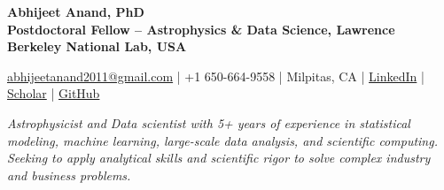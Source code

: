 \documentclass[a4paper,10pt]{article}
\begin{document}
\begin{center}
    {\huge \textbf{Abhijeet Anand, PhD}} \\
    {\normalsize \vspace{1.5mm}
    \textbf{Postdoctoral Fellow – Astrophysics \& Data Science, Lawrence Berkeley National Lab, USA}} 
    \vspace{-1mm}
    \begin{center}
    \normalfont
\href{mailto:abhijeetanand2011@gmail.com}{abhijeetanand2011@gmail.com} \quad | \quad 
    +1 650-664-9558 \quad | \quad Milpitas, CA \quad | \quad 
    \href{https://www.linkedin.com/in/abhijeet-anand-iisc}{LinkedIn} \quad | \quad 
    \href{https://scholar.google.com/citations?hl=en&user=MfOuq1IAAAAJ}{Scholar} \quad | \quad 
    \href{https://github.com/abhi0395}{GitHub}
    \end{center}
\end{center}
\begin{center}
\vspace*{-1.25mm}
\textit{Astrophysicist and Data scientist with 5+ years of experience in statistical modeling, machine learning, large-scale data analysis, and scientific computing. Seeking to apply analytical skills and scientific rigor to solve complex industry and business problems.}
\end{center}
\vspace*{-6mm}
\end{document}
